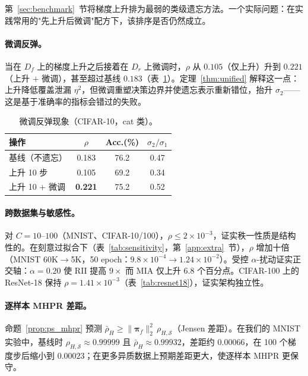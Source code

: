第~\ref{sec:benchmark}~节将梯度上升排为最弱的类级遗忘方法。一个实际问题：在实践常用的"先上升后微调"配方下，该排序是否仍然成立。

\paragraph{微调反弹。}当在 $D_f$ 上的梯度上升之后接着在 $D_r$ 上微调时，$\rho$ 从 $0.105$（仅上升）升到 $0.221$（上升 $+$ 微调），甚至超过基线 $0.183$（表~\ref{tab:rebound}）。定理~\ref{thm:unified} 解释这一点：上升降低覆盖泄漏 $\eta^2$，但微调重塑决策边界并使遗忘表示重新错位，抬升 $\sigma_2$——这是基于准确率的指标会错过的失败。

\begin{table}[t]
\centering
\small
\caption{微调反弹现象（CIFAR-10，cat 类）。}\label{tab:rebound}
\setlength{\tabcolsep}{2pt}
\begin{tabular}{l c c c}
\toprule
操作 & $\rho$ & Acc.(\%) & $\sigma_2/\sigma_1$ \\
\midrule
基线（不遗忘） & 0.183 & 76.2 & 0.47 \\
上升 10 步 & 0.105 & 69.2 & 0.34 \\
上升 10 + 微调 & \textbf{0.221} & 75.2 & 0.52 \\
\bottomrule
\end{tabular}
\end{table}

\paragraph{跨数据集与敏感性。}对 $C{=}10$--$100$（MNIST、CIFAR-10/100），$\rho\le2\times10^{-3}$，证实秩一性质是结构性的。在刻意过拟合下（表~\ref{tab:sensitivity}，第~\ref{app:extra}~节），$\rho$ 增加十倍（MNIST 60K$\to$5K，50 epoch：$9.8\times10^{-4}\to1.24\times10^{-2}$）。受控 $\alpha$-扰动证实正交轴：$\alpha{=}0.20$ 使 RII 提高 $9\times$ 而 MIA 仅上升 $6.8$ 个百分点。CIFAR-100 上的 ResNet-18 保持 $\rho{=}1.41\times10^{-3}$（表~\ref{tab:resnet18}），证实架构独立性。

\paragraph{逐样本 MHPR 差距。}命题~\ref{prop:ps_mhpr} 预测 $\bar{\rho}_H \ge \|\boldsymbol{\pi}_f\|_2^2\,\rho_{H,\mathcal{S}}$（Jensen 差距）。在我们的 MNIST 实验中，基线时 $\rho_{H,\mathcal{S}}{\approx}0.99999$ 且 $\bar{\rho}_H{\approx}0.99932$，差距约 $0.00066$，在 100 个梯度步后缩小到 $0.00023$；在更多异质数据上预期差距更大，使逐样本 MHPR 更保守。

